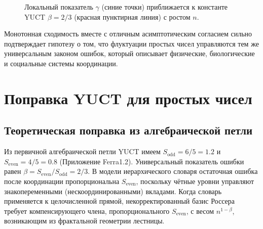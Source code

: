 \documentclass[12pt,a4paper]{article}
\newcommand{\Sodd}{S_{\mathrm{odd}}}
\newcommand{\Seven}{S_{\mathrm{even}}}
\begin{document}
	\begin{figure}[htbp]
		\centering
		\caption{Локальный показатель $\gamma$ (синие точки) приближается к константе YUCT $\beta = 2/3$ (красная пунктирная линия) с ростом $n$.}
		\label{fig:gamma-convergence}
	\end{figure}
	
	Монотонная сходимость вместе с отличным асимптотическим согласием сильно подтверждает гипотезу о том, что флуктуации простых чисел управляются тем же универсальным законом ошибок, который описывает физические, биологические и социальные системы координации.
	
	\section{Поправка YUCT для простых чисел}
	\subsection{Теоретическая поправка из алгебраической петли}
	Из первичной алгебраической петли YUCT имеем \(\Sodd = 6/5 = 1.2\) и \(\Seven = 4/5 = 0.8\) (Приложение Ferra1.2). Универсальный показатель ошибки равен \(\beta = \Seven/\Sodd = 2/3\). В модели иерархического словаря остаточная ошибка после координации пропорциональна \(\Seven\), поскольку чётные уровни управляют знакопеременными (нескоординированными) вкладами. Когда словарь применяется к целочисленной прямой, некорректированный базис Россера требует компенсирующего члена, пропорционального \(\Seven\), с весом \(n^{1-\beta}\), возникающим из фрактальной геометрии лестницы.
	
\end{document}
